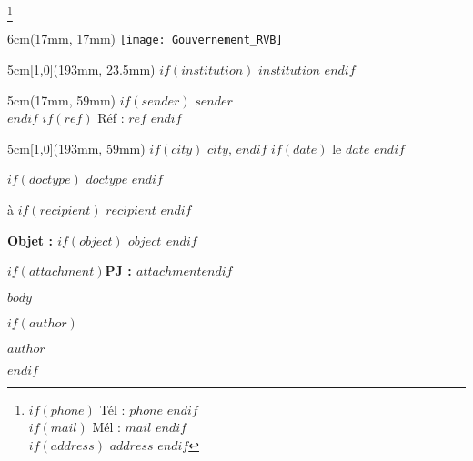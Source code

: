 \documentclass[10pt]{article}
\begin{document}
\let\thefootnote\relax\footnote{\scriptsize\color{Gray} $if(phone)$ Tél : $phone$ $endif$ \\
    $if(mail)$ Mél : $mail$ $endif$ \\
    $if(address)$ $address$ $endif$}

\begin{textblock*}{6cm}(17mm, 17mm)
\texttt{[image: Gouvernement\_RVB]}
\end{textblock*}


\begin{textblock*}{5cm}[1,0](193mm, 23.5mm)
$if(institution)$ \large \raggedleft	\textbf{$institution$} $endif$
\end{textblock*}

\begin{textblock*}{5cm}(17mm, 59mm)
$if(sender)$ $sender$ \\ $endif$
$if(ref)$ \footnotesize Réf : $ref$ $endif$
\end{textblock*}


\begin{textblock*}{5cm}[1,0](193mm, 59mm)
\footnotesize \raggedleft $if(city)$ $city$, $endif$ $if(date)$ le $date$ $endif$
\end{textblock*}

\vspace*{50mm}

\begin{center}
$if(doctype)$ \large\textbf{$doctype$} $endif$
\end{center}

\begin{center}
\large à $if(recipient)$ $recipient$ $endif$
\end{center}

\vspace{30mm}
\textbf{Objet : $if(object)$ $object$ $endif$}

$if(attachment)$\textbf{PJ : $attachment$}$endif$
\vspace{5mm}

$body$

\bigskip

$if(author)$
\begin{flushright}
\textbf{$author$}
\end{flushright}
$endif$
\end{document}
